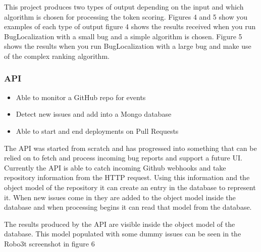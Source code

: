 \documentclass[12pt]{article}
\providecommand{\tightlist}{%
  \setlength{\itemsep}{0pt}\setlength{\parskip}{0pt}}
\begin{document}
This project produces two types of output depending on the input and
which algorithm is chosen for processing the token scoring. Figures 4
and 5 show you examples of each type of output figure 4 shows the
results received when you run BugLocalization with a small bug and a
simple algorithm is chosen. Figure 5 shows the results when you run
BugLocalization with a large bug and make use of the complex ranking
algorithm.

\hypertarget{api}{%
\subsubsection{API}\label{api}}

\begin{itemize}
\tightlist
\item
  Able to monitor a GitHub repo for events
\item
  Detect new issues and add into a Mongo database
\item
  Able to start and end deployments on Pull Requests
\end{itemize}

The API was started from scratch and has progressed into something that
can be relied on to fetch and process incoming bug reports and support a
future UI. Currently the API is able to catch incoming Github webhooks
and take repository information from the HTTP request. Using this
information and the object model of the repository it can create an
entry in the database to represent it. When new issues come in they are
added to the object model inside the database and when processing begins
it can read that model from the database.

The results produced by the API are visible inside the object model of
the database. This model populated with some dummy issues can be seen in
the Robo3t screenshot in figure 6

\newpage
\end{document}
